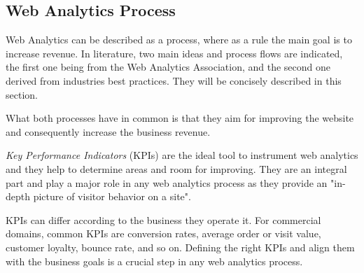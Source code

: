 






\subsection{Web Analytics Process}


Web Analytics can be described as a process, where as a rule the main goal is to increase revenue.
In literature, two main ideas and process flows are indicated, the first one being from the Web Analytics Association, and the second one derived from industries best practices.
They will be concisely described in this section.

What both processes have in common is that they aim for improving the website and consequently increase the business revenue.

\textit{Key Performance Indicators} (KPIs) are the ideal tool to instrument web analytics and they help to determine areas and room for improving.
They are an integral part and play a major role in any web analytics process as they provide an "in-depth picture of visitor behavior on a site". %

KPIs can differ according to the business they operate it.
For commercial domains, common KPIs are conversion rates, average order or visit value, customer loyalty, bounce rate, and so on.%
Defining the right KPIs and align them with the business goals is a crucial step in any web analytics process.




